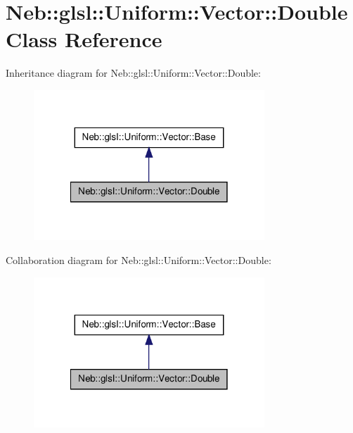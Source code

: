 \hypertarget{classNeb_1_1glsl_1_1Uniform_1_1Vector_1_1Double}{\section{\-Neb\-:\-:glsl\-:\-:\-Uniform\-:\-:\-Vector\-:\-:\-Double \-Class \-Reference}
\label{classNeb_1_1glsl_1_1Uniform_1_1Vector_1_1Double}
}


\-Inheritance diagram for \-Neb\-:\-:glsl\-:\-:\-Uniform\-:\-:\-Vector\-:\-:\-Double\-:\nopagebreak
\begin{figure}[H]
\begin{center}
\leavevmode
\includegraphics[width=246pt]{classNeb_1_1glsl_1_1Uniform_1_1Vector_1_1Double__inherit__graph}
\end{center}
\end{figure}


\-Collaboration diagram for \-Neb\-:\-:glsl\-:\-:\-Uniform\-:\-:\-Vector\-:\-:\-Double\-:\nopagebreak
\begin{figure}[H]
\begin{center}
\leavevmode
\includegraphics[width=246pt]{classNeb_1_1glsl_1_1Uniform_1_1Vector_1_1Double__coll__graph}
\end{center}
\end{figure}
